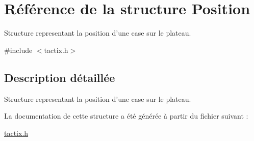\hypertarget{struct_position}{\section{Référence de la structure Position}
\label{struct_position}
}


Structure representant la position d'une case sur le plateau.  




{\ttfamily \#include $<$tactix.\-h$>$}



\subsection{Description détaillée}
Structure representant la position d'une case sur le plateau. 

La documentation de cette structure a été générée à partir du fichier suivant \-:\begin{DoxyCompactItemize}
\item 
\hyperlink{tactix_8h}{tactix.\-h}\end{DoxyCompactItemize}
